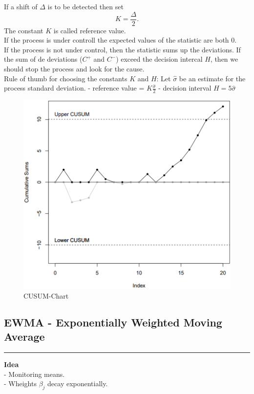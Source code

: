 If a shift of $\Delta$ is to be detected then set
\begin{equation}
  K = \frac{\Delta}{2}.
\end{equation}
The constant $K$ is called reference value.\\

If the process is under controll the expected values of the statistic are both 0.\\
If the process is not under control, then the statistic sums up the deviations. If the sum of de deviations ($C^+$ and $C^-$) exceed the decision intercal $H$, then we should stop the process and look for the cause.\\

Rule of thumb for choosing the constants $K$ and $H$:
Let $\hat{\sigma}$ be an estimate for the process standard deviation.
- reference value = $K \frac{\hat{\sigma}}{2}$
- decision interval $H = 5\hat{\sigma}$

\begin{figure}[H]
  \centering
  \includegraphics[width=0.8\linewidth]{Pics/4.1.png}
  \caption{CUSUM-Chart}
  \label{CUSUM}
\end{figure}


\subsection{EWMA - Exponentially Weighted Moving Average}
\noindent\rule[\linienAbstand]{\linewidth}{\linienDicke}
\textbf{Idea}\\
 - Monitoring means.\\
 - Wheights $\beta_j$ decay exponentially.\\

